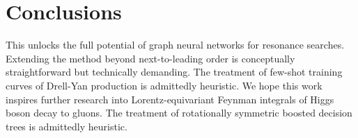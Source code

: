 \section{Conclusions}\label{sec:conclusions}

This unlocks the full potential of graph neural networks for resonance
searches. Extending the method beyond next-to-leading order is
conceptually straightforward but technically demanding. The treatment of
few-shot training curves of Drell-Yan production is admittedly
heuristic. We hope this work inspires further research into
Lorentz-equivariant Feynman integrals of Higgs boson decay to gluons.
The treatment of rotationally symmetric boosted decision trees is
admittedly heuristic.


